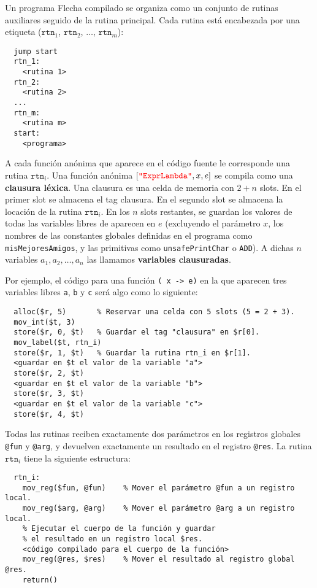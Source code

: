 \documentclass{article}
\newcommand{\flecha}{\textsf{Flecha}\xspace}
\newcommand{\fl}[1]{\texttt{#1}}
\newcommand{\astkw}[1]{\texttt{\textcolor{red}{"#1"}}}
\begin{document}
Un programa \flecha compilado se organiza como un conjunto de rutinas
auxiliares seguido de la rutina principal.
Cada rutina está encabezada por una etiqueta
($\texttt{rtn}_1$, $\texttt{rtn}_2$, $\hdots$, $\texttt{rtn}_m$):
\begin{verbatim}
  jump start
  rtn_1:
    <rutina 1>
  rtn_2:
    <rutina 2>
  ...
  rtn_m:
    <rutina m>
  start:
    <programa>
\end{verbatim}
A cada función anónima que aparece en el código fuente le corresponde una
rutina $\texttt{rtn}_i$.
Una función anónima $[\astkw{ExprLambda}, x, e]$ se compila como una
{\bf clausura léxica}. Una clausura es una celda de memoria con $2 + n$ slots.
En el primer slot se almacena el tag clausura.
En el segundo slot se almacena la locación de la rutina $\texttt{rtn}_i$.
En los $n$ slots restantes, se guardan los valores de todas
las variables libres de aparecen en $e$ (excluyendo el parámetro $x$,
los nombres de las constantes globales definidas en el programa
como \texttt{misMejoresAmigos},
y las primitivas como \texttt{unsafePrintChar} o \texttt{ADD}).
A dichas $n$ variables $a_1,a_2,\hdots,a_n$ las llamamos
{\bf variables clausuradas}.

Por ejemplo, el código para una función \fl{(\ x -> e)} en la que aparecen
tres variables libres \fl{a}, \fl{b} y \fl{c} será algo como lo siguiente:
\begin{verbatim}
  alloc($r, 5)       % Reservar una celda con 5 slots (5 = 2 + 3).
  mov_int($t, 3)
  store($r, 0, $t)   % Guardar el tag "clausura" en $r[0].
  mov_label($t, rtn_i)
  store($r, 1, $t)   % Guardar la rutina rtn_i en $r[1].
  <guardar en $t el valor de la variable "a">
  store($r, 2, $t)
  <guardar en $t el valor de la variable "b">
  store($r, 3, $t)
  <guardar en $t el valor de la variable "c">
  store($r, 4, $t)
\end{verbatim}

Todas las rutinas reciben exactamente dos parámetros en los registros
globales \texttt{@fun} y \texttt{@arg},
y devuelven exactamente un resultado en el registro \texttt{@res}.
La rutina $\texttt{rtn}_i$ tiene la siguiente estructura:
\begin{verbatim}
  rtn_i:
    mov_reg($fun, @fun)    % Mover el parámetro @fun a un registro local.
    mov_reg($arg, @arg)    % Mover el parámetro @arg a un registro local.
    % Ejecutar el cuerpo de la función y guardar
    % el resultado en un registro local $res.
    <código compilado para el cuerpo de la función>
    mov_reg(@res, $res)    % Mover el resultado al registro global @res.
    return()
\end{verbatim}
\end{document}
